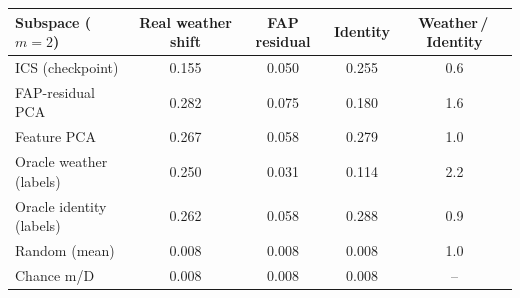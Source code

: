 \begin{tabular}{lcccc}
\toprule
Subspace ($m{=}2$) & Real weather shift & FAP residual & Identity & Weather\,/\,Identity \\
\midrule
ICS (checkpoint) & 0.155 & 0.050 & 0.255 & 0.6 \\
FAP-residual PCA & 0.282 & 0.075 & 0.180 & 1.6 \\
Feature PCA & 0.267 & 0.058 & 0.279 & 1.0 \\
Oracle weather (labels) & 0.250 & 0.031 & 0.114 & 2.2 \\
Oracle identity (labels) & 0.262 & 0.058 & 0.288 & 0.9 \\
Random (mean) & 0.008 & 0.008 & 0.008 & 1.0 \\
Chance m/D & 0.008 & 0.008 & 0.008 & -- \\
\bottomrule
\end{tabular}
